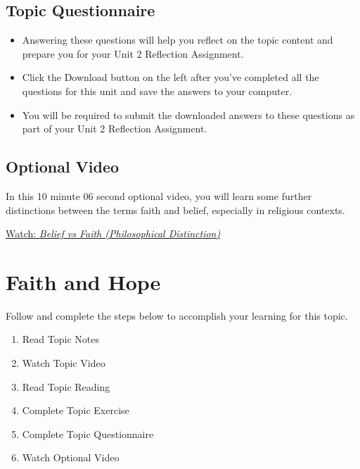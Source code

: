 \documentclass[
]{book}
\providecommand{\tightlist}{%
  \setlength{\itemsep}{0pt}\setlength{\parskip}{0pt}}
\begin{document}
\hypertarget{topic-questionnaire}{%
\subsection*{Topic Questionnaire}\label{topic-questionnaire}}

\begin{reflect}
\begin{itemize}
\tightlist
\item
  Answering these questions will help you reflect on the topic content and prepare you for your Unit 2 Reflection Assignment.
\item
  Click the Download button on the left after you've completed all the questions for this unit and save the answers to your computer.
\item
  You will be required to submit the downloaded answers to these questions as part of your Unit 2 Reflection Assignment.
\end{itemize}
\end{reflect}

\hypertarget{optional-video}{%
\subsection*{Optional Video}\label{optional-video}}

\begin{reflect}
In this 10 minute 06 second optional video, you will learn some further distinctions between the terms faith and belief, especially in religious contexts.

\href{https://www.youtube.com/watch?v=o8QKkHWUSu0}{Watch: \emph{Belief vs Faith (Philosophical Distinction)}}
\end{reflect}

\hypertarget{faith-and-hope}{%
\section{Faith and Hope}\label{faith-and-hope}}

Follow and complete the steps below to accomplish your learning for this topic.

\begin{enumerate}
\def\labelenumi{\arabic{enumi}.}
\tightlist
\item
  Read Topic Notes
\item
  Watch Topic Video
\item
  Read Topic Reading
\item
  Complete Topic Exercise
\item
  Complete Topic Questionnaire
\item
  Watch Optional Video
\end{enumerate}
\end{document}
